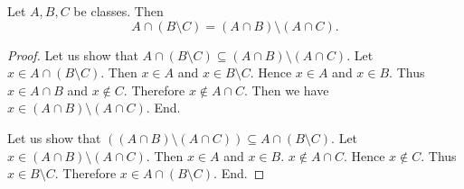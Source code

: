 \documentclass[../set-theory.tex]{subfiles}
\begin{document}
  \begin{forthel}
    \begin{proposition}\label{SET_THEORY_02_5811954316738560}
      Let $A, B, C$ be classes.
      Then \[ A \cap (B \setminus C) = (A \cap B) \setminus (A \cap C). \]
    \end{proposition}
    \begin{proof}
      Let us show that $A \cap (B \setminus C) \subseteq (A \cap B) \setminus (A \cap C)$.
        Let $x \in A \cap (B \setminus C)$.
        Then $x \in A$ and $x \in B \setminus C$.
        Hence $x \in A$ and $x \in B$.
        Thus $x \in A \cap B$ and $x \notin C$.
        Therefore $x \notin A \cap C$.
        Then we have $x \in (A \cap B) \setminus (A \cap C)$.
      End.

      Let us show that $((A \cap B) \setminus (A \cap C)) \subseteq A \cap (B \setminus C)$. %
        Let $x \in (A \cap B) \setminus (A \cap C)$.
        Then $x \in A$ and $x \in B$.
        $x \notin A \cap C$.
        Hence $x \notin C$.
        Thus $x \in B \setminus C$.
        Therefore $x \in A \cap (B \setminus C)$.
      End.
    \end{proof}
  \end{forthel}
\end{document}
